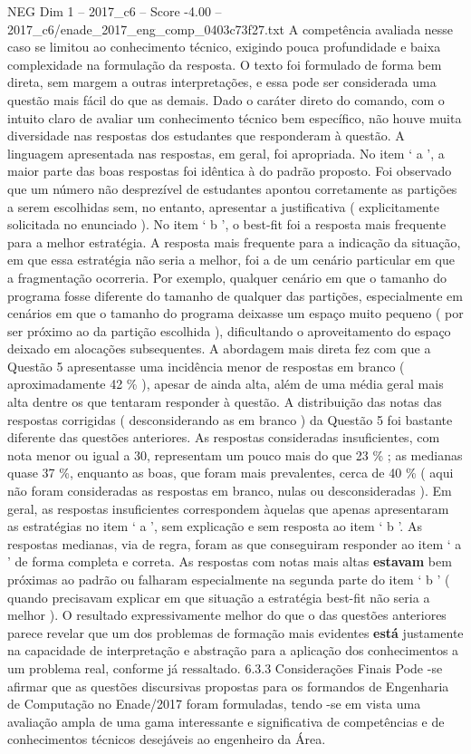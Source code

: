 \begin{textsample}{NEG Dim 1 – 2017\_c6 – Score -4.00 – 2017\_c6/enade\_2017\_eng\_comp\_0403c73f27.txt}
A competência avaliada nesse caso se limitou ao conhecimento técnico, exigindo pouca profundidade e baixa complexidade na formulação da resposta.
O texto foi formulado de forma bem direta, sem margem a outras interpretações, e essa pode ser considerada uma questão mais fácil do que as demais.
Dado o caráter direto do comando, com o intuito claro de avaliar um conhecimento técnico bem específico, não houve muita diversidade nas respostas dos estudantes que responderam à questão.
A linguagem apresentada nas respostas, em geral, foi apropriada.
No item ‘ a ’, a maior parte das boas respostas foi idêntica à do padrão proposto.
Foi observado que um número não desprezível de estudantes apontou corretamente as partições a serem escolhidas sem, no entanto, apresentar a justificativa ( explicitamente solicitada no enunciado ).
No item ‘ b ’, o best-fit foi a resposta mais frequente para a melhor estratégia.
A resposta mais frequente para a indicação da situação, em que essa estratégia não seria a melhor, foi a de um cenário particular em que a fragmentação ocorreria.
Por exemplo, qualquer cenário em que o tamanho do programa fosse diferente do tamanho de qualquer das partições, especialmente em cenários em que o tamanho do programa deixasse um espaço muito pequeno ( por ser próximo ao da partição escolhida ), dificultando o aproveitamento do espaço deixado em alocações subsequentes.
A abordagem mais direta fez com que a Questão 5 apresentasse uma incidência menor de respostas em branco ( aproximadamente 42 \% ), apesar de ainda alta, além de uma média geral mais alta dentre os que tentaram responder à questão.
A distribuição das notas das respostas corrigidas ( desconsiderando as em branco ) da Questão 5 foi bastante diferente das questões anteriores.
As respostas consideradas insuficientes, com nota menor ou igual a 30, representam um pouco mais do que 23 \% ; as medianas quase 37 \%, enquanto as boas, que foram mais prevalentes, cerca de 40 \% ( aqui não foram consideradas as respostas em branco, nulas ou desconsideradas ).
Em geral, as respostas insuficientes correspondem àquelas que apenas apresentaram as estratégias no item ‘ a ’, sem explicação e sem resposta ao item ‘ b ’.
As respostas medianas, via de regra, foram as que conseguiram responder ao item ‘ a ’ de forma completa e correta.
As respostas com notas mais altas \textbf{estavam} bem próximas ao padrão ou falharam especialmente na segunda parte do item ‘ b ’ ( quando precisavam explicar em que situação a estratégia best-fit não seria a melhor ).
O resultado expressivamente melhor do que o das questões anteriores parece revelar que um dos problemas de formação mais evidentes \textbf{está} justamente na capacidade de interpretação e abstração para a aplicação dos conhecimentos a um problema real, conforme já ressaltado. 6.3.3 Considerações Finais Pode -se afirmar que as questões discursivas propostas para os formandos de Engenharia de Computação no Enade/2017 foram formuladas, tendo -se em vista uma avaliação ampla de uma gama interessante e significativa de competências e de conhecimentos técnicos desejáveis ao engenheiro da Área.

\end{textsample}
